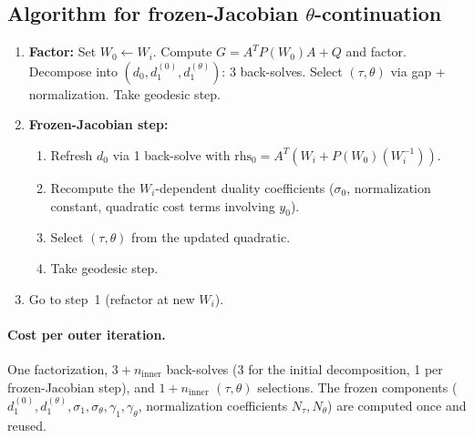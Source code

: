 \documentclass{article}
\begin{document}
\subsection{Algorithm for frozen-Jacobian $\theta$-continuation}

\begin{enumerate}
\item \textbf{Factor:} Set $W_0 \leftarrow W_i$.  Compute
  $G = A^T P(W_0) A + Q$ and factor.  Decompose into
  $(d_0, d_1^{(0)}, d_1^{(\theta)})$: 3 back-solves.
  Select $(\tau, \theta)$ via gap + normalization.  Take geodesic step.
\item \textbf{Frozen-Jacobian step:}
  \begin{enumerate}
  \item Refresh $d_0$ via 1 back-solve with
    $\text{rhs}_0 = A^T(W_i + P(W_0)(W_i^{-1}))$.
  \item Recompute the $W_i$-dependent duality coefficients ($\sigma_0$,
    normalization constant, quadratic cost terms involving $y_0$).
  \item Select $(\tau, \theta)$ from the updated quadratic.
  \item Take geodesic step.
  \end{enumerate}
\item Go to step~1 (refactor at new $W_i$).
\end{enumerate}

\paragraph{Cost per outer iteration.}
One factorization, $3 + n_{\text{inner}}$ back-solves (3 for the initial
decomposition, 1 per frozen-Jacobian step), and $1 + n_{\text{inner}}$
$(\tau,\theta)$ selections.  The frozen components ($d_1^{(0)},
d_1^{(\theta)}, \sigma_1, \sigma_\theta, \gamma_1, \gamma_\theta$,
normalization coefficients $N_\tau, N_\theta$) are computed once and
reused.
\end{document}
